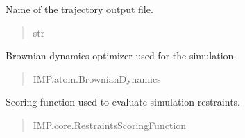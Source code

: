 \documentclass[letterpaper,10pt,english]{sphinxmanual}
\begin{document}
\begin{fulllineitems}
\begin{fulllineitems}
\begin{quote}
\begin{description}
\end{description}\end{quote}

\end{fulllineitems}


\begin{fulllineitems}
\label{\detokenize{src:src.Simulation_Class.Simulation.output_traj_file}}
\pysigstartsignatures
{}
\pysigstopsignatures
\sphinxAtStartPar
Name of the trajectory output file.
\begin{quote}\begin{description}
\sphinxAtStartPar
str

\end{description}\end{quote}

\end{fulllineitems}


\begin{fulllineitems}
\label{\detokenize{src:src.Simulation_Class.Simulation.bd}}
\pysigstartsignatures
{}
\pysigstopsignatures
\sphinxAtStartPar
Brownian dynamics optimizer used for the simulation.
\begin{quote}\begin{description}
\sphinxAtStartPar
IMP.atom.BrownianDynamics

\end{description}\end{quote}

\end{fulllineitems}


\begin{fulllineitems}
\label{\detokenize{src:src.Simulation_Class.Simulation.scoring_function}}
\pysigstartsignatures
{}
\pysigstopsignatures
\sphinxAtStartPar
Scoring function used to evaluate simulation restraints.
\begin{quote}\begin{description}
\sphinxAtStartPar
IMP.core.RestraintsScoringFunction


\end{description}
\end{quote}
\end{fulllineitems}
\end{fulllineitems}
\end{document}
